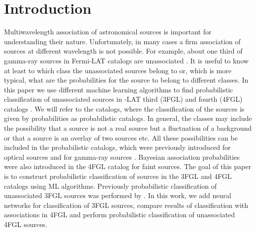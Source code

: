 \section{Introduction}

Multiwavelength association of astronomical sources is important for understanding their nature.
Unfortunately, in many cases a firm association of sources at different wavelength is not possible.
For example, about one third of gamma-ray sources in Fermi-LAT catalogs are unassociated
\citep{2010ApJS..188..405A, 2012ApJS..199...31N, 2015ApJS..218...23A, 2020ApJS..247...33A}.
It is useful to know at least to which class the unassociated sources belong to or, which is more typical,
what are the probabilities for the source to belong to different classes.
In this paper we use different machine learning algorithms to find probabilistic classification of
unassociated sources in \Fermi-LAT third (3FGL) and fourth (4FGL) catalogs \citep{2015ApJS..218...23A, 2020ApJS..247...33A}.
We will refer to the catalogs, where the classification of the sources is given by probabilities as probabilistic catalogs.
In general, the classes may include the possibility that a source is not a real source but a fluctuation of a background 
or that a source is an overlay of two sources etc.
All these possibilities can be included in the probabilistic catalogs, which were previously introduced for optical sources 
\citep[e.g.,][]{2010EAS....45..351H, 2013AJ....146....7B}
and for gamma-ray sources \citep{2017ApJ...839....4D}.
Bayesian association probabilities were also introduced in the 4FGL catalog \citep{2020ApJS..247...33A} for faint sources.
The goal of this paper is to construct probabilistic classification of sources in the 3FGL and 4FGL catalogs using ML algorithms.
Previously probabilistic classification of unassociated 3FGL sources was performed by \cite{2016ApJ...820....8S}.
In this work, we add neural networks for classification of 3FGL sources, compare results of classification
with associations in 4FGL and perform probabilistic classification of unassociated 4FGL sources.


